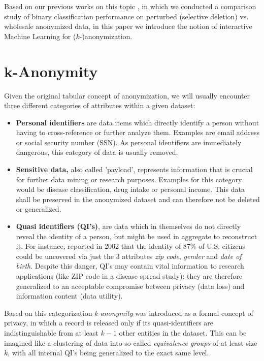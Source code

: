 \documentclass{llncs}
\begin{document}
Based on our previous works on this topic \cite{malle2016right} \cite{MalleKieseHolzinger:2017:DoNotDisturb}, in which we conducted a comparison study of binary classification performance on perturbed (selective deletion) vs. wholesale anonymized data, in this paper we introduce the notion of interactive Machine Learning for ($k$-)anonymization.



\section{k-Anonymity}
\label{sect:k_anon}

Given the original tabular concept of anonymization, we will usually encounter three different categories of attributes within a given dataset:

\begin{itemize}
	\item \textbf{Personal identifiers} are data items which directly identify a person without having to cross-reference or further analyze them. Examples are email address or social security number (SSN). As personal identifiers are immediately dangerous, this category of data is usually removed.
	\item \textbf{Sensitive data,} also called 'payload', represents information that is crucial for further data mining or research purposes. Examples for this category would be disease classification, drug intake or personal income. This data shall be preserved in the anonymized dataset and can therefore not be deleted or generalized.
	\item \textbf{Quasi identifiers (QI's)}, are data which in themselves do not directly reveal the identity of a person, but might be used in aggregate to reconstruct it. For instance, \cite{sweeney2002k} reported in 2002 that the identity of 87\% of U.S. citizens could be uncovered via just the 3 attributes \textit{zip code}, \textit{gender} and \textit{date of birth}. Despite this danger, QI's may contain vital information to research applications (like ZIP code in a disease spread study); they are therefore generalized to an acceptable compromise between privacy (data loss) and information content (data utility).
\end{itemize}

Based on this categorization \textit{k-anonymity} \cite{Samarati:2001:kAnonymity} was introduced as a formal concept of privacy, in which a record is released only if its quasi-identifiers are indistinguishable from at least $k-1$ other entities in the dataset. This can be imagined like a clustering of data into so-called \textit{equivalence groups} of at least size $k$, with all internal QI's being generalized to the exact same level.
\end{document}
